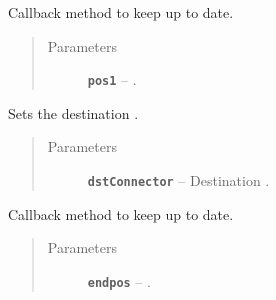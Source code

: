 \documentclass[a4paper,10pt,english]{sphinxmanual}
\begin{document}
\begin{fulllineitems}
\begin{fulllineitems}
\begin{quote}
\begin{description}
\end{description}\end{quote}

\end{fulllineitems}


\begin{fulllineitems}
\label{model_link:model.ArcItem.ArcItem.setBeginPos}
Callback method to keep  up to date.
\begin{quote}\begin{description}
\item[{Parameters}] \leavevmode
\textbf{\texttt{pos1}} -- .

\end{description}\end{quote}

\end{fulllineitems}


\begin{fulllineitems}
\label{model_link:model.ArcItem.ArcItem.setDestination}
Sets the destination .
\begin{quote}\begin{description}
\item[{Parameters}] \leavevmode
\textbf{\texttt{dstConnector}} -- Destination .

\end{description}\end{quote}

\end{fulllineitems}


\begin{fulllineitems}
\label{model_link:model.ArcItem.ArcItem.setEndPos}
Callback method to keep  up to date.
\begin{quote}\begin{description}
\item[{Parameters}] \leavevmode
\textbf{\texttt{endpos}} -- .


\end{description}
\end{quote}
\end{fulllineitems}
\end{fulllineitems}
\end{document}
